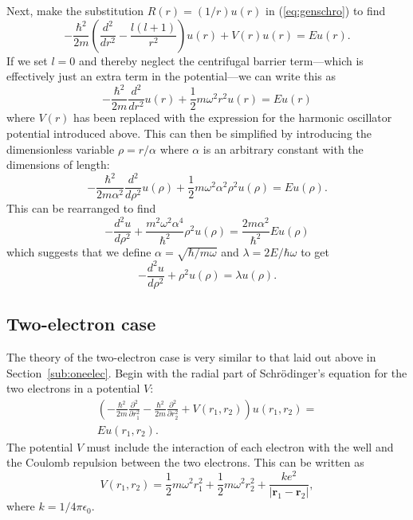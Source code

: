 \documentclass[aps,prc,reprint]{revtex4-1}
\begin{document}
        Next, make the substitution $R(r) = (1/r) u(r)$ in (\ref{eq:genschro}) to find
        \begin{equation*}
            -\frac{\hbar^2}{2m} \left( \frac{d^2}{dr^2} - \frac{l(l+1)}{r^2} \right) u(r) + V(r)u(r) = Eu(r).
        \end{equation*}
        If we set $l = 0$ and thereby neglect the centrifugal barrier term---which is effectively just an extra term in the potential---we can write this as
        \begin{equation*}
            -\frac{\hbar^2}{2m} \frac{d^2}{dr^2} u(r) + \frac{1}{2} m \omega^2 r^2 u(r) = Eu(r)
        \end{equation*}
        where $V(r)$ has been replaced with the expression for the harmonic oscillator potential introduced above. This can then be simplified by introducing the dimensionless variable $\rho = r / \alpha$ where $\alpha$ is an arbitrary constant with the dimensions of length:
        \begin{equation*}
            -\frac{\hbar^2}{2m\alpha^2} \frac{d^2}{d\rho^2} u(\rho) + \frac{1}{2} m \omega^2 \alpha^2 \rho^2 u(\rho) = Eu(\rho).
        \end{equation*}
        This can be rearranged to find
        \begin{equation*}
            -\frac{d^2 u}{d\rho^2} + \frac{m^2\omega^2\alpha^4}{\hbar^2} \rho^2 u(\rho) = \frac{2m\alpha^2}{\hbar^2} E u(\rho)
        \end{equation*}
        which suggests that we define $\alpha = \sqrt{\hbar / m\omega}$ and $\lambda = 2E / \hbar\omega$ to get
        \begin{equation}
            -\frac{d^2 u}{d\rho^2} + \rho^2 u(\rho) = \lambda u(\rho).  \label{eq:oneelecfinal}
        \end{equation}

    \subsection{Two-electron case}
    \label{sub:twoelec}
        The theory of the two-electron case is very similar to that laid out above in Section~\ref{sub:oneelec}. Begin with the radial part of Schr\"odinger's equation for the two electrons in a potential $V$:
        \begin{multline}
            \left( -\frac{\hbar^2}{2m} \frac{\partial^2}{\partial r_1^2} - \frac{\hbar^2}{2m} \frac{\partial^2}{\partial r_2^2} + V(r_1, r_2) \right) u(r_1, r_2) ={} \\ Eu(r_1, r_2).  \label{eq:twoelecbase}
        \end{multline}
        The potential $V$ must include the interaction of each electron with the well and the Coulomb repulsion between the two electrons. This can be written as
        \begin{equation*}
            V(r_1, r_2) = \frac{1}{2}m\omega^2 r_1^2 + \frac{1}{2}m\omega^2 r_2^2 + \frac{ke^2}{|\mathbf{r}_1 - \mathbf{r}_2|},
        \end{equation*}
        where $k = 1 / 4\pi\epsilon_0$.
\end{document}
